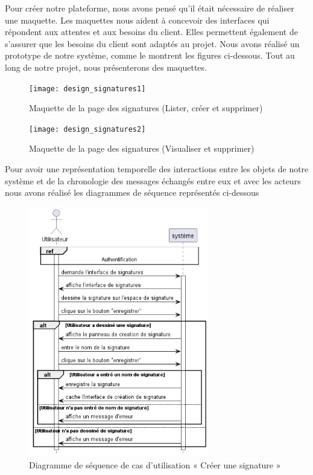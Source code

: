 Pour créer notre plateforme, nous avons pensé qu'il était nécessaire de réaliser une maquette. Les maquettes nous aident à concevoir des interfaces qui répondent aux attentes et aux besoins du client. Elles permettent également de s'assurer que les besoins du client sont adaptés au projet. Nous avons réalisé un prototype de notre système, comme le montrent les figures ci-dessous. Tout au long de notre projet, nous présenterons des maquettes.

\begin{figure}[H]
  \centering
  \texttt{[image: design\_signatures1]}
  \caption{Maquette de la page des signatures (Lister, créer et supprimer)}
  \label{fig:design_signatures}
\end{figure}

\begin{figure}[H]
  \centering
  \texttt{[image: design\_signatures2]}
  \caption{Maquette de la page des signatures (Visualiser et supprimer)}
  \label{fig:design_preview_delete_signature}
\end{figure}


Pour avoir une représentation temporelle des interactions entre les objets de notre système et de la chronologie des messages échangés entre eux et avec les acteurs nous avons réalisé les diagrammes de séquence représentés ci-dessous

\begin{figure}[H]
  \centering
  \includegraphics[width=0.7\textwidth]{out/diagrams/signatures/create/create_signature}
  \caption{Diagramme de séquence de cas d'utilisation « Créer une signature  »}
  \label{fig:sequence_create_signature}
\end{figure}

